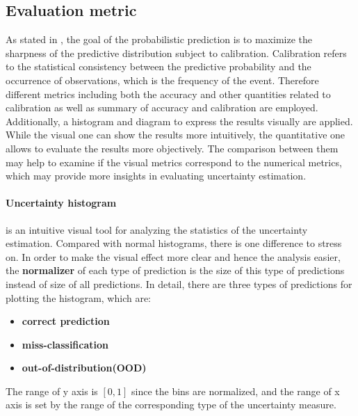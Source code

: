 \subsection{Evaluation metric}
As stated in \cite{gneiting2007probabilistic}, the goal of the probabilistic prediction is to maximize the sharpness of the predictive distribution subject to calibration.
Calibration refers to the statistical consistency between the predictive probability and the occurrence of observations, which is the frequency of the event.
Therefore different metrics including both the accuracy and other quantities related to calibration as well as summary of accuracy and calibration are employed.
Additionally, a histogram and diagram to express the results visually are applied.
While the visual one can show the results more intuitively, the quantitative one allows to evaluate the results more objectively.
The comparison between them may help to examine if the visual metrics correspond to the numerical metrics, which may provide more insights in evaluating uncertainty estimation. 

\paragraph{Uncertainty histogram} is an intuitive visual tool for analyzing the statistics of the uncertainty estimation.
Compared with normal histograms, there is one difference to stress on.
In order to make the visual effect more clear and hence the analysis easier, the \textbf{normalizer} of each type of prediction is the size of this type of predictions instead of size of all predictions.
In detail, there are three types of predictions for plotting the histogram, which are:
 \begin{itemize}
 	\item \textbf{correct prediction}
 	\item \textbf{miss-classification}
 	\item \textbf{out-of-distribution(OOD)}
 \end{itemize}The range of y axis is $[0,1]$ since the bins are normalized, and the range of x axis is set by the range of the corresponding type of the uncertainty measure.

